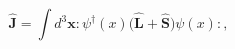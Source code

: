 \begin{equation}
\widehat{\mathbf{J}}=\int d^{3}\mathbf{x}:\psi ^{\dagger }\left( x\right) 
\mathbf{(}\widehat{\mathbf{L}}+\widehat{\mathbf{S}})\psi \left( x\right): ,
\end{equation}

